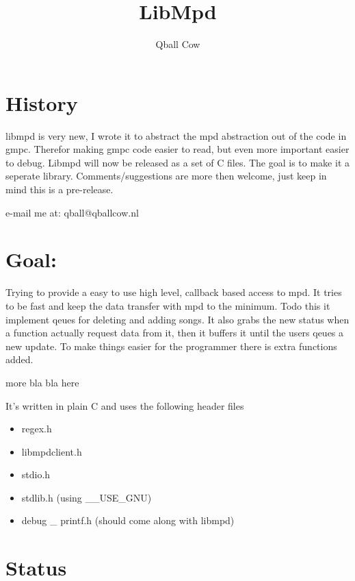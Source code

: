 \documentclass[a4paper,11pt]{article}
\begin{document}
\title{LibMpd} 
\author{Qball Cow}
\maketitle

\section{History}

libmpd is very new, I wrote it to abstract the mpd abstraction out of the code
in gmpc. Therefor making gmpc code easier to read, but even more important
easier to debug. Libmpd will now be released as a set of C files. The goal is
to make it a seperate library. Comments/suggestions are more then welcome,
just keep in mind this is a pre-release.

e-mail me at: qball@qballcow.nl

\section{Goal: }

Trying to provide a easy to use high level, callback based access to mpd. It
tries to be fast and keep the data transfer with mpd to the minimum. 
Todo this it implement qeues for deleting and adding songs. It also grabs the new status when a function actually request data from it, then it buffers it until the users qeues a new update. To make things easier for the programmer there is extra functions added.

{\color{red} more bla bla here}

It's written in plain C and uses the following header files
\begin{itemize}
  \item regex.h
  
  \item libmpdclient.h
  
  \item stdio.h
  
  \item stdlib.h (using  \_\_USE\_GNU)
  
  \item debug \_ printf.h (should come along with libmpd)
\end{itemize}

\section{Status}
\end{document}
